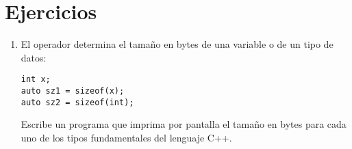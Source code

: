 \section{Ejercicios}

\begin{enumerate}

\item El operador  determina el tamaño en bytes de una variable o de
un tipo de datos:

\begin{lstlisting}
int x;
auto sz1 = sizeof(x);
auto sz2 = sizeof(int);
\end{lstlisting}

Escribe un programa que imprima por pantalla el tamaño en bytes para cada uno de los
tipos fundamentales del lenguaje C++.


\end{enumerate}
